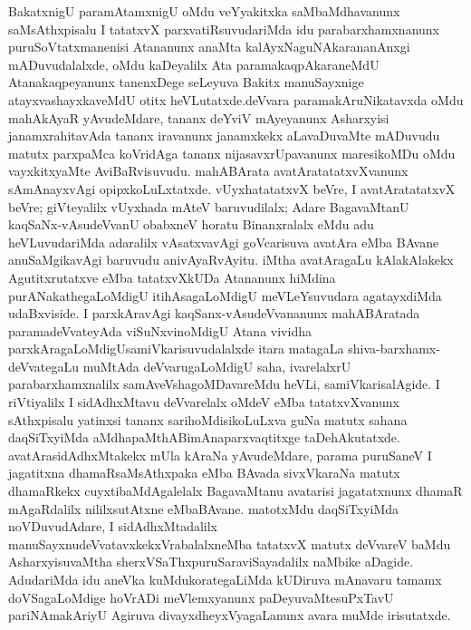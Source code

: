 BakatxnigU paramAtamxnigU oMdu veYyakitxka saMbaMdhavanunx saMsAthxpisalu I tatatxvX parxvatiRsuvudariMda idu parabarxhamxnanunx puruSoVtatxmanenisi Atananunx anaMta kalAyxNa\-guNAkarananAnxgi mADuvudalalxde, oMdu kaDeyalilx Ata paramakaqpAkaraneMdU Atana\break kaqpeyanunx tanenxDege seLeyuva Bakitx manuSayxnige atayxvashayxkaveMdU otitx heVLutatxde.\break deVvara paramakAruNikatavxda oMdu mahAkAyaR yAvudeMdare, tananx deYviV mAye\-yanunx Asharxyisi janamxrahitavAda tananx iravanunx janamxkekx aLavaDuvaMte mADuvudu matutx parxpaMca koVridAga tananx nijasavxrUpavanunx maresikoMDu oMdu vayxkitxyaMte AviBaRvisuvudu. mahABArata avatAratatatxvXvanunx sAmAnayxvAgi opipxkoLuLxtatxde. vUyxhatatatxvX beVre, I avatAratatatxvX beVre; giVteyalilx vUyxhada mAteV baruvudilalx; Adare BagavaMtanU kaqSaNx-vAsudeVvanU obabxneV horatu Binanxralalx eMdu adu heVLuvudariMda adaralilx vAsatxvavAgi goVcarisuva avatAra eMba BAvane anuSaMgika\-vAgi baruvudu anivAyaRvAyitu. iMtha avatAragaLu kAlakAlakekx Agutitxru\-tatxve eMba tatatxvXkUDa Atananunx hiMdina purANakathegaLoMdigU itihAsagaLoMdigU meVLeYsuvudara agatayxdiMda udaBxviside. I parxkAravAgi kaqSanx-vAsudeVvananunx mahA\break\-BAratada paramadeVvateyAda viSuNxvinoMdigU Atana vividha parxkAragaLoMdigU\break samiVkarisuvudalalxde itara matagaLa shiva-barxhamx-deVvategaLu muMtAda deVvaru\break\-gaLoMdigU saha, ivarelalxrU parabarxhamxnalilx samAveVshagoMDavareMdu heVLi, samiV\-karisalAgide. I riVtiyalilx I sidAdhxMtavu deVvarelalx oMdeV eMba tatatxvXvanunx sAthxpi\-salu yatinxsi tananx sarihoMdisikoLuLxva guNa matutx sahana daqSiTxyiMda aMdhapaMthABimAna\break parxvaqtitxge taDehAkutatxde. avatArasidAdhxMtakekx mUla kAraNa yAvudeMdare, parama puru\-SaneV I jagatitxna dhamaRsaMsAthxpaka eMba BAvada sivxVkaraNa matutx dhamaRkekx cuyxti\-baMdAgalelalx BagavaMtanu avatarisi jagatatxnunx dhamaR mAgaRdalilx nililxsutAtxne eMba\break BAvane. matotxMdu daqSiTxyiMda noVDuvudAdare, I sidAdhxMtadalilx manuSayxnu\break deVvatavxkekxVrabalalxneMba tatatxvX matutx deVvareV baMdu AsharxyisuvaMtha sherxVSaThxpuruSara\break viSayadalilx naMbike aDagide. AdudariMda idu aneVka kuMdukorategaLiMda kUDi\-ruva mAnavaru tamamx doVSagaLoMdige hoVrADi meVlemxyanunx paDeyuvaMte\break suPxTavU pariNAmakAriyU Agiruva divayxdheyxVyagaLanunx avara muMde irisutatxde.

\theendnotes
{}
